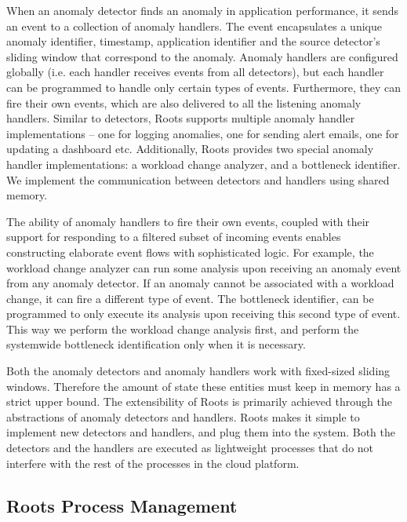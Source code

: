 When an anomaly detector finds an anomaly in application performance, it sends an event
to a collection of anomaly handlers. The event encapsulates a unique anomaly identifier, 
timestamp, application identifier and the source detector's sliding window that correspond to the
anomaly. Anomaly handlers are configured globally (i.e. each handler
receives events from all detectors), but each handler can be programmed to handle only
certain types of events. Furthermore, they can fire their own events, which are also delivered to
all the listening anomaly handlers. Similar to detectors, Roots supports multiple anomaly handler
implementations -- one for logging anomalies, one for sending alert emails, one
for updating a dashboard etc. Additionally, Roots provides two special anomaly handler
implementations: a workload change analyzer, and a bottleneck identifier.
We implement the communication between detectors and handlers 
using shared memory.

The ability of anomaly handlers to fire their own events, coupled with their support
for responding to a filtered subset of incoming events enables constructing
elaborate event flows with sophisticated logic. For example, the workload
change analyzer can run some analysis upon receiving an anomaly event
from any anomaly detector. If an anomaly cannot be associated with a workload
change, it can fire a different type of event. The bottleneck identifier, can
be programmed to only execute its analysis upon receiving this second type of event.
This way we perform the workload change analysis first, and perform the
systemwide bottleneck identification only when it is necessary.

Both the anomaly detectors and anomaly handlers work with fixed-sized sliding windows.
Therefore the amount of state these entities must keep in memory has
a strict upper bound. 
The extensibility of Roots is primarily achieved through the abstractions of anomaly
detectors and handlers. Roots makes it simple to implement new detectors and handlers,
and plug them into the system. Both the detectors and the handlers are executed
as lightweight processes that do not interfere with the rest of the processes in
the cloud platform. 

\subsection{Roots Process Management}
\label{sec:process_mgt}

